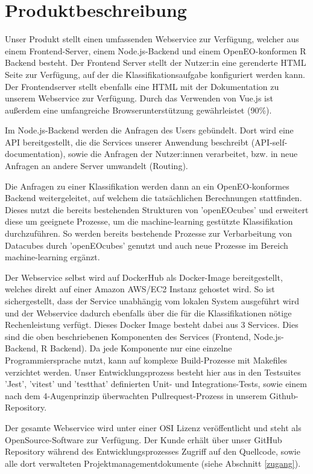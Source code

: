 \documentclass[a4paper,12pt]{article}
\begin{document}
\section{Produktbeschreibung} \label{produktbeschreibung}
\par
Unser Produkt stellt einen umfassenden Webservice zur Verfügung, welcher aus einem Frontend-Server, einem Node.js-Backend und einem OpenEO-konformen R Backend besteht.
Der Frontend Server stellt der Nutzer:in eine gerenderte HTML Seite zur Verfügung, auf der die Klassifikationsaufgabe konfiguriert werden kann. Der Frontendserver stellt ebenfalls eine HTML mit der Dokumentation zu unserem Webservice zur Verfügung.  Durch das Verwenden von Vue.js ist außerdem eine umfangreiche Browserunterstützung gewährleistet (90\%).
\par
Im Node.js-Backend werden die Anfragen des Users gebündelt. Dort wird eine API bereitgestellt, die die Services unserer Anwendung beschreibt (API-self-documentation), sowie die Anfragen der Nutzer:innen verarbeitet, bzw. in neue Anfragen an andere Server umwandelt (Routing).
\par
Die Anfragen zu einer Klassifikation werden dann an ein OpenEO-konformes Backend weitergeleitet, auf welchem die tatsächlichen Berechnungen stattfinden. Dieses nutzt die bereits bestehenden Strukturen von 'openEOcubes' und erweitert diese um geeignete Prozesse, um die machine-learning gestützte Klassifikation durchzuführen. So werden bereits bestehende Prozesse zur Verbarbeitung von Datacubes durch 'openEOcubes' genutzt und auch neue Prozesse im Bereich machine-learning ergänzt.
\par
Der Webservice selbst wird auf DockerHub als Docker-Image bereitgestellt, welches direkt auf einer Amazon AWS/EC2 Instanz gehostet wird. So ist sichergestellt, dass der Service unabhängig vom lokalen System ausgeführt wird und der Webservice dadurch ebenfalls über die für die Klassifikationen nötige Rechenleistung verfügt.
Dieses Docker Image besteht dabei aus 3 Services. Dies sind die oben beschriebenen Komponenten des Services (Frontend, Node.js-Backend, R Backend). Da jede Komponente nur eine einzelne Programmiersprache nutzt, kann auf komplexe Build-Prozesse mit Makefiles verzichtet werden. Unser Entwicklungsprozess besteht hier aus in den Testsuites 'Jest', 'vitest' und 'testthat' definierten Unit- und Integrations-Tests, sowie einem nach dem 4-Augenprinzip überwachten Pullrequest-Prozess in unserem Github-Repository.
\par
Der gesamte Webservice wird unter einer OSI Lizenz veröffentlicht und steht als OpenSource-Software zur Verfügung. Der Kunde erhält über unser GitHub Repository während des Entwicklungsprozesses Zugriff auf den Quellcode, sowie alle dort verwalteten Projektmanagementdokumente (siehe Abschnitt \ref{zugang}).
\end{document}
